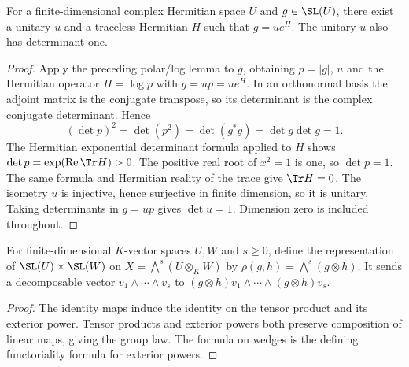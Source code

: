 \begin{lemma}
\label{lem:balanced-special-linear-polar}
\leanok
{}
For a finite-dimensional complex Hermitian space $U$ and $g\in\SL(U)$,
there exist a unitary $u$ and a traceless Hermitian $H$ such that
$g=ue^H$. The unitary $u$ also has determinant one.
\end{lemma}
\begin{proof}
Apply the preceding polar/log lemma to $g$, obtaining $p=|g|$,
$u$ and the Hermitian operator $H=\log p$ with $g=up=ue^H$.
In an orthonormal basis the adjoint matrix is the conjugate transpose,
so its determinant is the complex conjugate determinant. Hence
\[
 (\det p)^2=\det(p^2)=\det(g^*g)=\overline{\det g}\det g=1.
\]
The Hermitian exponential determinant formula applied to $H$ shows
$\det p=\exp(\operatorname{Re}\Tr H)>0$. The positive real root of
$x^2=1$ is one, so $\det p=1$. The same formula and Hermitian reality
of the trace give $\Tr H=0$. The isometry $u$ is injective, hence
surjective in finite dimension, so it is unitary. Taking determinants
in $g=up$ gives $\det u=1$. Dimension zero is included throughout.
\end{proof}

\begin{definition}
\label{def:balanced-plucker-action}
\leanok
For finite-dimensional $K$-vector spaces $U,W$ and $s\geq0$, define the representation of
$\SL(U)\times\SL(W)$ on $X=\bigwedge^s(U\otimes_K W)$ by
$\rho(g,h)=\bigwedge^s(g\otimes h)$. It sends a decomposable vector
$v_1\wedge\cdots\wedge v_s$ to
$(g\otimes h)v_1\wedge\cdots\wedge(g\otimes h)v_s$.
\end{definition}
\begin{proof}
The identity maps induce the identity on the tensor product and its
exterior power. Tensor products and exterior powers both preserve
composition of linear maps, giving the group law. The formula on wedges
is the defining functoriality formula for exterior powers.
\end{proof}

